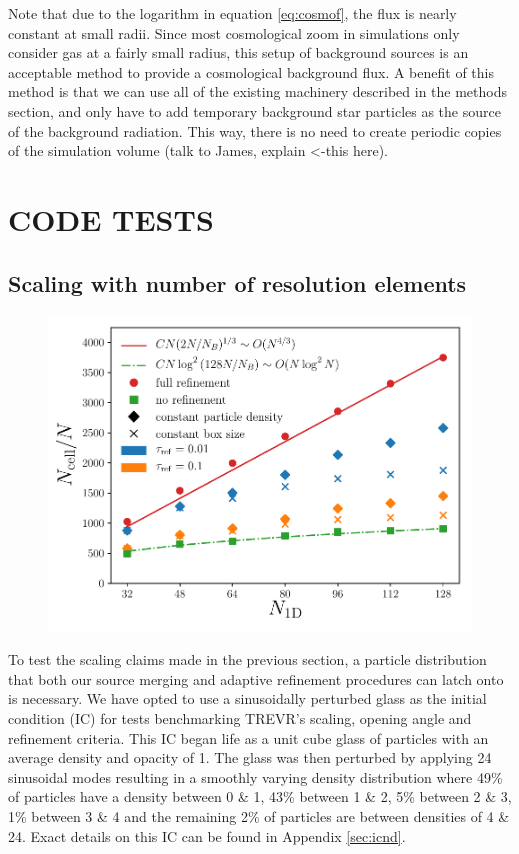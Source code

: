 \documentclass[fleq,usenatbib]{mnras}
\newcommand{\acro}{TREVR}
\begin{document}
Note that due to the logarithm in equation \ref{eq:cosmof}, the flux is nearly 
constant at small radii. Since most cosmological zoom in simulations only 
consider gas at a fairly small radius, this setup of background sources is an 
acceptable method to provide a cosmological background flux. A benefit of this 
method is that we can use all of the existing machinery described in the 
methods section, and only have to add temporary background star particles as 
the source of the background radiation. This way, there is no need to create 
periodic copies of the simulation volume (talk to James, explain <-this here).

\section{CODE TESTS}\label{sec:tsts}
\subsection{Scaling with number of resolution elements}
\begin{figure}
\includegraphics[width=1\linewidth]{Figures/particle_scaling.pdf}
\caption{}
\label{fig:pscale}
\end{figure}
To test the scaling claims made in the previous section, a particle 
distribution that both our source merging and adaptive refinement procedures 
can latch onto is necessary. We have opted to use a sinusoidally perturbed 
glass as the initial condition (IC) for tests benchmarking \acro{}'s scaling, 
opening angle and refinement criteria. This IC began life as a unit cube glass 
of particles with an average density and opacity of 1. The glass was then 
perturbed by applying 24 sinusoidal modes resulting in a smoothly varying 
density distribution where 49\% of particles have a density between 0 \& 1, 
43\% between 1 \& 2, 5\% between 2 \& 3, 1\% between 3 \& 4 and the remaining 
2\% of particles are between densities of 4 \& 24. Exact details on this IC 
can be found in Appendix \ref{sec:icnd}.
\end{document}
